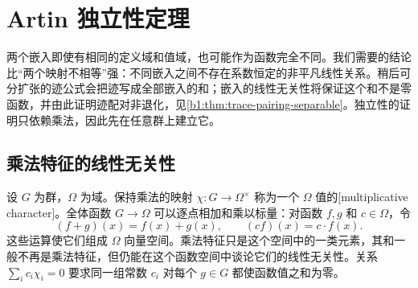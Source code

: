 
\section{Artin 独立性定理}
\label{b1:sec:1801}

%
%

两个嵌入即使有相同的定义域和值域，也可能作为函数完全不同。我们需要的结论比“两个映射不相等”强：不同嵌入之间不存在系数恒定的非平凡线性关系。稍后可分扩张的迹公式会把迹写成全部嵌入的和；嵌入的线性无关性将保证这个和不是零函数，并由此证明迹配对非退化，见\cref{b1:thm:trace-pairing-separable}。独立性的证明只依赖乘法，因此先在任意群上建立它。

\subsection{乘法特征的线性无关性}
\label{b1:subsec:1801:01}

设 \(G\) 为群，\(\Omega\) 为域。保持乘法的映射 \(\chi:G\rightarrow\Omega^\times\) 称为一个 \(\Omega\) 值的[multiplicative character]。全体函数 \(G\rightarrow\Omega\) 可以逐点相加和乘以标量：对函数 \(f,g\) 和 \(c\in\Omega\)，令
\[
	(f+g)(x)=f(x)+g(x),\qquad (cf)(x)=c\cdot f(x).
\]
这些运算使它们组成 \(\Omega\) 向量空间。乘法特征只是这个空间中的一类元素，其和一般不再是乘法特征，但仍能在这个函数空间中谈论它们的线性无关性。关系 \(\sum_i c_i\chi_i=0\) 要求同一组常数 \(c_i\) 对每个 \(g\in G\) 都使函数值之和为零。

